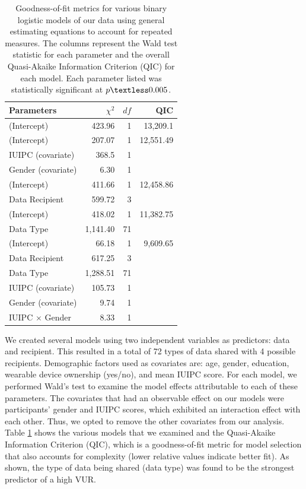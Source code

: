 \documentclass[conference]{IEEEtran}
\begin{document}
\begin{table}[t]
\centering
\begin{tabular}{|l| r| r| r|}
\hline
Parameters & $\chi^2$ & $df$ & QIC\\
\hline
\hline
(Intercept) & 423.96 & 1 & 13,209.1\\
\hline
(Intercept) & 207.07 & 1 & 12,551.49\\
IUIPC (covariate) & 368.5 & 1 & \\
Gender (covariate) & 6.30 & 1 & \\
\hline
(Intercept) & 411.66 & 1 &12,458.86\\
Data Recipient & 599.72 & 3 & \\
\hline
(Intercept) & 418.02 & 1 & 11,382.75\\
Data Type & 1,141.40 & 71 & \\
\hline
(Intercept) & 66.18 & 1 & 9,609.65 \\
Data Recipient & 617.25 & 3 & \\
Data Type & 1,288.51 & 71 & \\
IUIPC (covariate) & 105.73 & 1 & \\
Gender (covariate) & 9.74 & 1 & \\
IUIPC $\times$ Gender & 8.33 & 1 &\\
\hline
\end{tabular}
\caption{Goodness-of-fit metrics for various binary logistic models of our data using general estimating equations to account for repeated measures. The columns represent the Wald test statistic for each parameter and the overall Quasi-Akaike Information Criterion (QIC) for each model. Each parameter listed was statistically significant at $p\textless0.005$.}
\label{regression}
\end{table}

We created several models using two independent variables as predictors: data and recipient. This resulted in a total of 72 types of data shared with 4 possible recipients. Demographic factors used as covariates are: age, gender, education, wearable device ownership (yes/no), and mean IUIPC score. For each model, we performed Wald's test to examine the model effects attributable to each of these parameters. The covariates that had an observable effect on our models were participants' gender and IUIPC scores, which exhibited an interaction effect with each other. Thus, we opted to remove the other covariates from our analysis. Table \ref{regression} shows the various models that we examined and the Quasi-Akaike Information Criterion (QIC), which is a goodness-of-fit metric for model selection that also accounts for complexity (lower relative values indicate better fit). As shown, the type of data being shared (data type) was found to be the strongest predictor of a high VUR.
\end{document}
